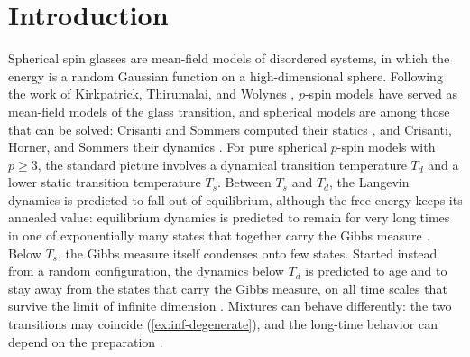 \chapter{Introduction}\label{sec:intro}

Spherical spin glasses are mean-field models of disordered systems, in which the energy is a random Gaussian function on a high-dimensional sphere. Following the work of Kirkpatrick, Thirumalai, and Wolynes \cite{KirkpatrickThirumalai1987,KirkpatrickWolynes1987,KirkpatrickThirumalaiWolynes1989}, $p$-spin models have served as mean-field models of the glass transition, and spherical models are among those that can be solved: Crisanti and Sommers computed their statics \cite{CrisantiSommers1992}, and Crisanti, Horner, and Sommers their dynamics \cite{CrisantiHornerSommers1993}. For pure spherical $p$-spin models with $p\ge3$, the standard picture involves a dynamical transition temperature $T_d$ and a lower static transition temperature $T_s$. Between $T_s$ and $T_d$, the Langevin dynamics is predicted to fall out of equilibrium, although the free energy keeps its annealed value: equilibrium dynamics is predicted to remain for very long times in one of exponentially many states that together carry the Gibbs measure \cite{CrisantiHornerSommers1993,FranzParisi1995,BarratBurioniMezard1996}. Below $T_s$, the Gibbs measure itself condenses onto few states. Started instead from a random configuration, the dynamics below $T_d$ is predicted to age and to stay away from the states that carry the Gibbs measure, on all time scales that survive the limit of infinite dimension \cite{CugliandoloKurchan1993}. Mixtures can behave differently: the two transitions may coincide (\cref{ex:inf-degenerate}), and the long-time behavior can depend on the preparation \cite{FolenaFranzRicciTersenghi2020}.

